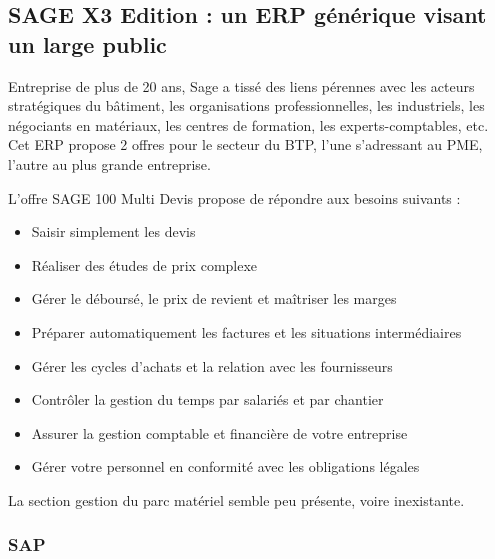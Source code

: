 	    \subsection{SAGE X3 Edition : un ERP générique visant un large public}


		Entreprise de plus de 20 ans, Sage a tissé des liens pérennes avec les acteurs stratégiques du bâtiment, les organisations professionnelles, les industriels, les négociants en matériaux, les centres de formation, les experts-comptables, etc.
		Cet ERP propose 2 offres pour le secteur du BTP, l'une s'adressant au PME, l'autre au plus grande entreprise.

		L'offre SAGE 100 Multi Devis propose de répondre aux besoins suivants :
		\begin{itemize}
		    \item Saisir simplement les devis
		    \item Réaliser des études de prix complexe
		    \item Gérer le déboursé, le prix de revient et maîtriser les marges
		    \item Préparer automatiquement les factures et les situations intermédiaires
		    \item Gérer les cycles d’achats et la relation avec les fournisseurs
		    \item Contrôler la gestion du temps par salariés et par chantier
		    \item Assurer la gestion comptable et financière de votre entreprise
		    \item Gérer votre personnel en conformité avec les obligations légales\\
		\end{itemize}

		La section gestion du parc matériel semble peu présente, voire inexistante.

		\subsubsection{SAP}

